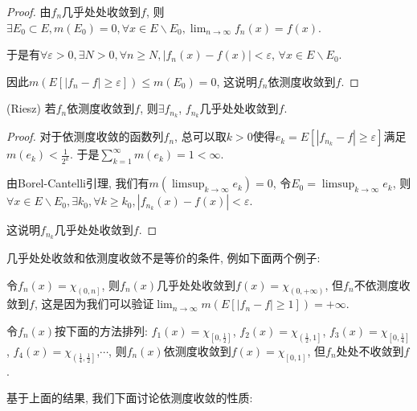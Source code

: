 \documentclass[theorem=false,mathfont=none,openany,sub3section]{easybook}
\begin{document}
\begin{proof}
  由$f_n$几乎处处收敛到$f$, 则$\exists E_0\subset E, m(E_0)=0, \forall x\in E\backslash E_0, \lim_{n \to \infty}f_n(x)=f(x)$.\par
  于是有$\forall \varepsilon >0, \exists N>0, \forall n\geqslant N, |f_n(x)-f(x)|<\varepsilon$, $\forall x\in E\backslash E_0$.\par
  因此$m\left(E\left[|f_n-f|\geqslant \varepsilon\right]\right)\leqslant m(E_0)=0$, 这说明$f_n$依测度收敛到$f$.\par
\end{proof}

\begin{theorem}
  (Riesz) 若$f_n$依测度收敛到$f$, 则$\exists f_{n_k}$, $f_{n_k}$几乎处处收敛到$f$.\par
\end{theorem}

\begin{proof}
  对于依测度收敛的函数列$f_n$, 总可以取$k>0$使得$e_k=E\left[|f_{n_k}-f|\geqslant \varepsilon\right]$满足$m(e_k)< \frac{1}{2^k}$. 于是$\sum_{k=1}^{\infty}m(e_k)=1<\infty$.\par
  由Borel-Cantelli引理, 我们有$m\left(\limsup_{k \to \infty}e_k\right)=0$, 令$E_0=\limsup_{k \to \infty}e_k$, 则$\forall x \in E\backslash E_0, \exists k_0, \forall k\geqslant k_0, |f_{n_k}(x)-f(x)|<\varepsilon$.\par
  这说明$f_{n_k}$几乎处处收敛到$f$.\par
\end{proof}

\begin{remark}
  几乎处处收敛和依测度收敛不是等价的条件, 例如下面两个例子:\par
  令$f_n(x)=\chi_{\left(\right.0,n\left.\right]}$, 则$f_n(x)$几乎处处收敛到$f(x)=\chi_{\left(\right.0,+\infty\left.\right)}$, 但$f_n$不依测度收敛到$f$, 这是因为我们可以验证$\lim_{n \to \infty}m\left(E\left[|f_n-f|\geqslant 1\right]\right) = +\infty$.\par
  令$f_n(x)$按下面的方法排列: $f_1(x)=\chi_{\left[\right.0,\frac{1}{2}\left.\right]}$, $f_2(x)=\chi_{\left(\right.\frac{1}{2},1\left.\right]}$, $f_3(x)=\chi_{\left[\right.0,\frac{1}{4}\left.\right]}$, $f_4(x)=\chi_{\left(\right.\frac{1}{4},\frac{1}{2}\left.\right]}$,$\cdots$, 则$f_n(x)$依测度收敛到$f(x)=\chi_{\left[\right.0,1\left.\right]}$, 但$f_n$处处不收敛到$f$.\par
\end{remark}

基于上面的结果, 我们下面讨论依测度收敛的性质:\par
\end{document}
